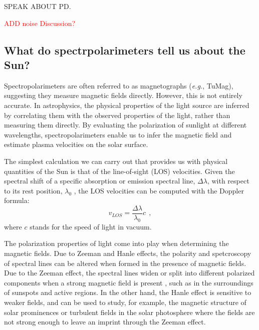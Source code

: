 SPEAK ABOUT PD. 

\textcolor{red}{ADD noise Discussion?}
 
\subsection{What do spectrpolarimeters tell us about the Sun?}

Spectropolarimeters are often referred to as magnetographs (\textit{e.g.}, TuMag), suggesting they measure magnetic fields directly. However, this is not entirely accurate. In astrophysics, the physical properties of the light source are inferred by correlating them with the observed properties of the light, rather than measuring them directly. By evaluating the polarization of sunlight at different wavelengths, spectropolarimeters enable us to infer the magnetic field and estimate plasma velocities on the solar surface. 

The simplest calculation we can carry out that provides us with physical quantities of the Sun is that of the line-of-sight (LOS) velocities. Given the spectral shift of a specific absorption or emission spectral line, $\Delta \lambda$, with respect to its rest position, $\lambda _ 0$ , the LOS velocities can be computed with the Doppler formula: 
\begin{equation}
  v_{LOS} = \frac{\Delta \lambda}{\lambda _ 0}c\ \ ,
  \label{eq_spectro: Doppler}
\end{equation}
where $c$ stands for the speed of light in vacuum. 

The polarization properties of light come into play when determining the magnetic fields. Due to Zeeman and Hanle effects, the polarity and spetcroscopy of spectral lines can be altered when formed in the presence of magnetic fields. Due to the Zeeman effect, the spectral lines widen or split into different polarized components when a strong magnetic field is present \citep{libro_JoseCarlos}, such as in the surroundings of sunspots and active regions. In the other hand, the Hanle effect is sensitive to weaker fields, and can be used to study, for example, the magnetic structure of solar prominences or turbulent fields in the solar photosphere \citep{hanle} where the fields are not strong enough to leave an imprint through the Zeeman effect.  

